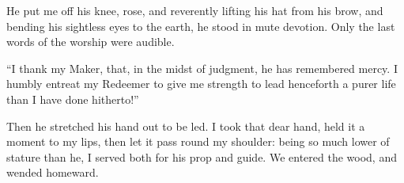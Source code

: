He put me off his knee, rose, and reverently lifting his hat from his
brow, and bending his sightless eyes to the earth, he stood in mute
devotion. Only the last words of the worship were audible.

\enquote{I thank my Maker, that, in the midst of judgment, he has
	remembered mercy. I humbly entreat my Redeemer to give me strength to
	lead henceforth a purer life than I have done hitherto!}

Then he stretched his hand out to be led. I took that dear hand, held
it a moment to my lips, then let it pass round my shoulder: being so
much lower of stature than he, I served both for his prop and guide. We
entered the wood, and wended homeward.

